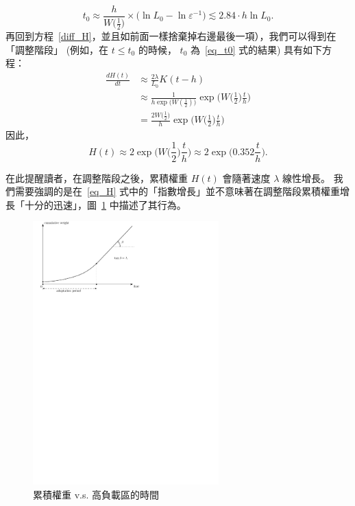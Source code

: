 \documentclass[12pt]{article}
\newcommand{\eps}{\varepsilon}
\begin{document}
\begin{CJK}{UTF8}{bkai}
\begin{equation}
 t_0 \approx \frac{h}{W\big({\textstyle\frac{1}{2}}\big)} 
\times \big(\ln L_0 - \ln \eps^{-1}\big)
\lesssim 2.84 \cdot h  \ln L_0.
\end{equation}
再回到方程~\eqref{diff_H}，並且如前面一樣捨棄掉右邊最後一項），我們可以得到在 「調整階段」
(例如，在 $t\leq t_0$ 的時候， $t_0$ 為~\eqref{eq_t0} 式的結果) 具有如下方程：
\begin{align*}
 \frac{d H(t)}{dt} &\approx \frac{2\lambda}
{L_0}K(t-h)
  \\
&\approx \frac{1}{h\exp\big(W(\frac{1}{2})\big)}
\exp\Big(W\big({\textstyle\frac{1}{2}}\big)\frac{t}{h}\Big)
\\
&= \frac{2W\big({\textstyle\frac{1}{2}}\big)}{h}
\exp\Big(W\big({\textstyle\frac{1}{2}}\big)\frac{t}{h}\Big)
\end{align*}
因此，
\begin{equation}
\label{eq_H}
 H(t)\approx 
2\exp\Big(W\big({\textstyle\frac{1}{2}}\big)\frac{t}{h}\Big)
\approx 2\exp\Big(0.352\frac{t}{h}\Big).
\end{equation}

在此提醒讀者，在調整階段之後，累積權重 $H(t)$ 會隨著速度 $\lambda$ 線性增長。
我們需要強調的是在~\eqref{eq_H} 式中的「指數增長」並不意味著在調整階段累積權重增長「十分的迅速」，圖~\ref{f_adapt_period} 中描述了其行為。
\begin{figure}
 \centering \includegraphics[width=0.64\textwidth]{adapt_period_1} 
\caption{累積權重 v.s. 高負載區的時間}
\label{f_adapt_period}
\end{figure}


\end{CJK}
\end{document}
